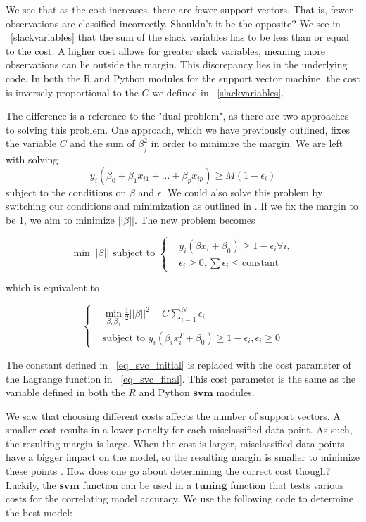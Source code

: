 \documentclass[12pt]{article}
\begin{document}
We see that as the cost increases, there are fewer support vectors. That is, fewer observations are classified incorrectly. Shouldn't it be the opposite? We see in ~\ref{slackvariables} that the sum of the slack variables has to be less than or equal to the cost. A higher cost allows for greater slack variables, meaning more observations can lie outside the margin. This discrepancy lies in the underlying code. In both the R and Python modules for the support vector machine, the cost is inversely proportional to the \(C\) we defined in ~\ref{slackvariables}.

The difference is a reference to the "dual problem", as there are two approaches to solving this problem. One approach, which we have previously outlined, fixes the variable \(C\) and the sum of \(\beta_j^2\) in order to minimize the margin. We are left with solving \[
    y_i(\beta_0+\beta_1x_{i1}+...+\beta_px_{ip}) \ge M(1-\epsilon_i)
    \]
subject to the conditions on \(\beta\) and \(\epsilon\). We could also solve this problem by switching our conditions and minimization as outlined in \cite{esl2}. If we fix the margin to be 1, we aim to minimize \(||\beta||\). The new problem becomes 

\begin{equation} 
    \min ||\beta|| \text{ subject to }
    \begin{cases}
        &y_i(\beta x_i + \beta_0) \ge 1 - \epsilon_i \forall i, \\ & \epsilon_i \ge 0, \sum \epsilon_i \le \text{constant} 
    \end{cases}
    \label{eq_svc_initial}
\end{equation}

which is equivalent to

\begin{equation}
    \begin{cases}
        & \min_{\beta,\beta_0} \frac{1}{2} ||\beta||^2 + C \sum_{i=1}^{N} \epsilon_i \\
        & \text{subject to } y_i(\beta_i x_i^T+\beta_0) \ge 1 - \epsilon_i, \epsilon_i \ge 0
    \end{cases}
    \label{eq_svc_final}
\end{equation}

The constant defined in ~\ref{eq_svc_initial} is replaced with the cost parameter of the Lagrange function in ~\ref{eq_svc_final}. This cost parameter is the same as the variable defined in both the $R$ and Python $\textbf{svm}$ modules.

We saw that choosing different costs affects the number of support vectors. A smaller cost results in a lower penalty for each misclassified data point. As such, the resulting margin is large. When the cost is larger, misclassified data points have a bigger impact on the model, so the resulting margin is smaller to minimize these points \citep{cost_parameter}. How does one go about determining the correct cost though? Luckily, the $\textbf{svm}$ function can be used in a $\textbf{tuning}$ function that tests various costs for the correlating model accuracy. We use the following code to determine the best model:
\end{document}
